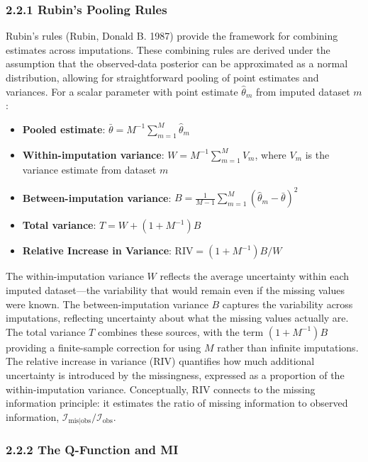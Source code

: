 \documentclass[
]{article}
\providecommand{\tightlist}{%
  \setlength{\itemsep}{0pt}\setlength{\parskip}{0pt}}
\begin{document}
\subsubsection{2.2.1 Rubin's Pooling Rules}\label{rubins-pooling-rules}

Rubin's rules (Rubin, Donald B. 1987) provide the framework for
combining estimates across imputations. These combining rules are
derived under the assumption that the observed-data posterior can be
approximated as a normal distribution, allowing for straightforward
pooling of point estimates and variances. For a scalar parameter with
point estimate \(\hat{\theta}_m\) from imputed dataset \(m\):

\begin{itemize}
\tightlist
\item
  \textbf{Pooled estimate}:
  \(\bar{\theta} = M^{-1}\sum_{m=1}^M \hat{\theta}_m\)
\item
  \textbf{Within-imputation variance}: \(W = M^{-1}\sum_{m=1}^M V_m\),
  where \(V_m\) is the variance estimate from dataset \(m\)
\item
  \textbf{Between-imputation variance}:
  \(B = \frac{1}{M-1}\sum_{m=1}^M(\hat{\theta}_m - \bar{\theta})^2\)
\item
  \textbf{Total variance}: \(T = W + (1 + M^{-1})B\)
\item
  \textbf{Relative Increase in Variance}:
  \(\text{RIV} = (1 + M^{-1})B / W\)
\end{itemize}

The within-imputation variance \(W\) reflects the average uncertainty
within each imputed dataset---the variability that would remain even if
the missing values were known. The between-imputation variance \(B\)
captures the variability across imputations, reflecting uncertainty
about what the missing values actually are. The total variance \(T\)
combines these sources, with the term \((1 + M^{-1})B\) providing a
finite-sample correction for using \(M\) rather than infinite
imputations. The relative increase in variance (RIV) quantifies how much
additional uncertainty is introduced by the missingness, expressed as a
proportion of the within-imputation variance. Conceptually, RIV connects
to the missing information principle: it estimates the ratio of missing
information to observed information,
\(\mathcal{I}_{\text{mis}|\text{obs}} / \mathcal{I}_{\text{obs}}\).

\subsubsection{2.2.2 The Q-Function and MI}\label{the-q-function-and-mi}
\end{document}
